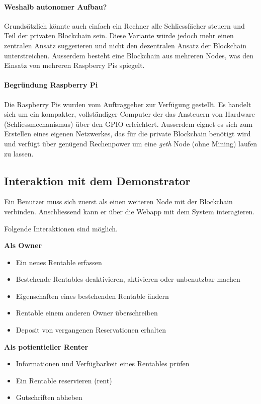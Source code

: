 \paragraph{Weshalb autonomer Aufbau?}
Grundsätzlich könnte auch einfach ein Rechner alle Schliessfächer steuern und Teil der privaten Blockchain sein. Diese Variante würde jedoch mehr einen zentralen Ansatz suggerieren und nicht den dezentralen Ansatz der Blockchain unterstreichen. Ausserdem besteht eine Blockchain aus mehreren Nodes, was den Einsatz von mehreren Raspberry Pis spiegelt. 
\paragraph{Begründung Raspberry Pi}
Die Raspberry Pis wurden vom Auftraggeber zur Verfügung gestellt. Es handelt sich um ein kompakter, vollständiger Computer der das Ansteuern von Hardware (Schliessmechanismus) über den GPIO erleichtert. Ausserdem eignet es sich zum Erstellen eines eigenen Netzwerkes, das für die private Blockchain benötigt wird und verfügt über genügend Rechenpower um eine \emph{geth} Node (ohne Mining) laufen zu lassen.

\subsection{Interaktion mit dem Demonstrator}
\label{sec:Interaktion mit dem Demonstrator}

Ein Benutzer muss sich zuerst als einen weiteren Node mit der Blockchain verbinden. Anschliessend kann er über die Webapp mit dem System interagieren.

\vspace{0.7em}\noindent
Folgende Interaktionen sind möglich.

\vspace{0.7em}\noindent
\textbf{Als Owner}
\begin{itemize}
    \item Ein neues Rentable erfassen
    \item Bestehende Rentables deaktivieren, aktivieren oder unbenutzbar machen
    \item Eigenschaften eines bestehenden Rentable ändern
    \item Rentable einem anderen Owner überschreiben
    \item Deposit von vergangenen Reservationen erhalten
\end{itemize}

\vspace{0.7em}\noindent
\textbf{Als potientieller Renter}
\begin{itemize}
    \item Informationen und Verfügbarkeit eines Rentables prüfen
    \item Ein Rentable reservieren (rent)
    \item Gutschriften abheben
\end{itemize}

